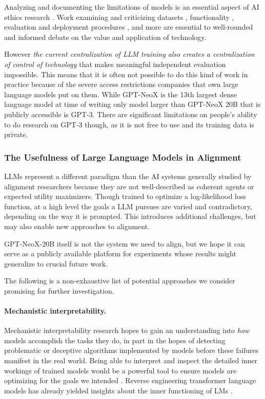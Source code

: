 \documentclass[11pt]{article}
\newcommand{\model}{GPT-NeoX-20B}
\begin{document}
Analyzing and documenting the limitations of models is an essential aspect of AI ethics research \citep{matias2021why}. Work examining and criticizing datasets \citep{kreutzer2021quality,dodge2021documenting,birhane2021multimodal}, functionality \citep{smart2021addressing,zhang2021counterfactual,carlini2022quantifying,biderman2022neural}, evaluation and deployment procedures \citep{biderman2020pitfalls,BS2022Reap}, and more are essential to well-rounded and informed debate on the value and application of technology.

However \textit{the current centralization of LLM training also creates a centralization of control of technology} \citep{sadowski2021everyone,whittaker2021steep} that makes meaningful independent evaluation impossible. This means that it is often not possible to do this kind of work in practice because of the severe access restrictions companies that own large language models put on them. While GPT-NeoX is the 13th largest dense language model at time of writing only model larger than GPT-NeoX 20B that is publicly accessible is GPT-3. There are significant limitations on people's ability to do research on GPT-3 though, as it is not free to use and its training data is private.

\subsubsection{The Usefulness of Large Language Models in Alignment}
\label{subsec:llms-for-alignment}

LLMs represent a different paradigm than the AI systems generally studied by alignment researchers because they are not well-described as coherent agents or expected utility maximizers. Though trained to optimize a log-likelihood loss function, at a high level the goals a LLM pursues are varied and contradictory, depending on the way it is prompted. This introduces additional challenges, but may also enable new approaches to alignment.

\model{} itself is not the system we need to align, but we hope it can serve as a publicly available platform for experiments whose results might generalize to crucial future work.

The following is a non-exhaustive list of potential approaches we consider promising for further investigation.

\paragraph{Mechanistic interpretability.} Mechanistic interpretability research \citep{circuits} hopes to gain an understanding into \textit{how} models accomplish the tasks they do, in part in the hopes of detecting problematic or deceptive algorithms implemented by models before these failures manifest in the real world. Being able to interpret and inspect the detailed inner workings of trained models would be a powerful tool to ensure models are optimizing for the goals we intended \citep{hubinger2021rlo,koch2021objective}. Reverse engineering transformer language models has already yielded insights about the inner functioning of LMs \citep{anthropic-transformer-circuits,logit-lens, meng2022locating, dai2021knowledge}.
\end{document}
